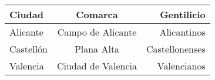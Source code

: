 \documentclass{article}
\begin{document}
\begin{tabular}{|l||c|r|}
  \hline
  Ciudad    & Comarca            & Gentilicio  \\ \hline\hline
  Alicante  & Campo de Alicante  & Alicantinos \\ \hline
  Castellón & Plana Alta         & Castellonenses \\ \hline
  Valencia  & Ciudad de Valencia & Valencianos \\
  \hline
\end{tabular}
\end{document}
